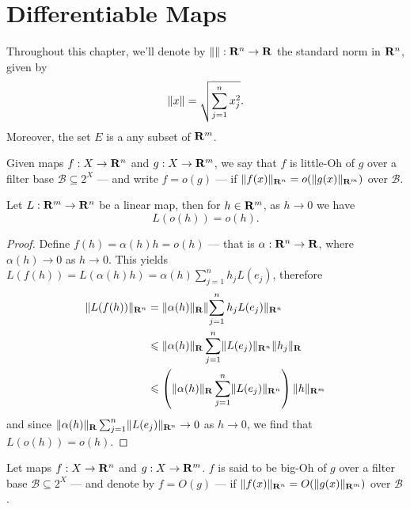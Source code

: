 \section{Differentiable Maps}\label{sec:differentiable-maps}

\begin{remark}
    Throughout this chapter, we'll denote by \(\lVert\rVert: \mathbf{R}^n \to \mathbf{R}\) the standard
    norm in \(\mathbf{R}^n\), given by
    \[
        \lVert x\rVert = \sqrt{\sum_{j=1}^n x_j^2}.
    \]
    Moreover, the set \(E\) is a any subset of \(\mathbf{R}^m\).
\end{remark}

\begin{definition}[Little-Oh]
    Given maps \(f: X \to \mathbf{R}^n\) and \(g: X \to \mathbf{R}^m\), we say that \(f\) is
    little-Oh of \(g\) over a filter base \(\mathcal B \subseteq 2^X\) --- and
    write \(f = o(g)\) --- if \(\lVert f(x)\rVert_{\mathbf{R}^n} = o(\lVert g(x)\rVert_{\mathbf{R}^m})\) over
    \(\mathcal B\).
\end{definition}

\begin{proposition}\label{prop: linear-little-oh}
    Let \(L: \mathbf{R}^m \to \mathbf{R}^n\) be a linear map, then for \(h \in \mathbf{R}^m\), as \(h \to
    0\) we have
    \[
        L(o(h)) = o(h).
    \]
\end{proposition}

\begin{proof}
    Define \(f(h) = \alpha(h) h = o(h)\) --- that is \(\alpha: \mathbf{R}^n \to \mathbf{R}\),
    where \(\alpha(h) \to 0\) as \(h \to 0\). This yields \(L(f(h)) = L(\alpha(h)
    h) = \alpha(h) \sum_{j=1}^n h_j L(e_j)\), therefore
    \begin{align*}
        \lVert L(f(h))\rVert_{\mathbf{R}^n}
         & = \lVert\alpha(h)\rVert_{\mathbf{R}} \lVert\sum_{j=1}^n h_j L(e_j)\rVert_{\mathbf{R}^n}               \\
         & \leqslant \lVert\alpha(h)\rVert_{\mathbf{R}} \sum_{j=1}^n \lVert L(e_j)\rVert_{\mathbf{R}^n} \lVert h_j\rVert_{\mathbf{R}}  \\
         & \leqslant \left( \lVert\alpha(h)\rVert_{\mathbf{R}} \sum_{j=1}^n \lVert L(e_j)\rVert_{\mathbf{R}^n} \right)
        \lVert h\rVert_{\mathbf{R}^m}
    \end{align*}
    and since \(\lVert\alpha(h)\rVert_{\mathbf{R}} \sum_{j=1}^n \lVert L(e_j)\rVert_{\mathbf{R}^n} \to 0\) as
    \(h \to 0\), we find that \(L(o(h)) = o(h)\).
\end{proof}

\begin{definition}[Big-Oh]
    Let maps \(f: X \to \mathbf{R}^n\) and \(g: X \to \mathbf{R}^m\). \(f\) is said to be big-Oh
    of \(g\) over a filter base \(\mathcal B \subseteq 2^X\) --- and denote by \(f
    = O(g)\) --- if \(\lVert f(x)\rVert_{\mathbf{R}^n} = O(\lVert g(x)\rVert_{\mathbf{R}^m})\) over \(\mathcal
    B\).
\end{definition}

